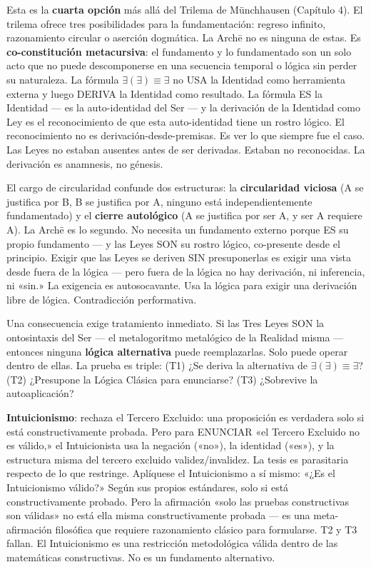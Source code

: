 \documentclass[10pt, openany, oneside]{book}
\begin{document}
Esta es la \textbf{cuarta opción} más allá del Trilema de M\"{u}nchhausen (Capítulo 4). El trilema ofrece tres posibilidades para la fundamentación: regreso infinito, razonamiento circular o aserción dogmática. La Arch\={e} no es ninguna de estas. Es \textbf{co-constitución metacursiva}: el fundamento y lo fundamentado son un solo acto que no puede descomponerse en una secuencia temporal o lógica sin perder su naturaleza. La fórmula $\exists(\exists) \equiv \exists$ no USA la Identidad como herramienta externa y luego DERIVA la Identidad como resultado. La fórmula ES la Identidad --- es la auto-identidad del Ser --- y la derivación de la Identidad como Ley es el reconocimiento de que esta auto-identidad tiene un rostro lógico. El reconocimiento no es derivación-desde-premisas. Es ver lo que siempre fue el caso. Las Leyes no estaban ausentes antes de ser derivadas. Estaban no reconocidas. La derivación es anamnesis, no génesis.

El cargo de circularidad confunde dos estructuras: la \textbf{circularidad viciosa} (A se justifica por B, B se justifica por A, ninguno está independientemente fundamentado) y el \textbf{cierre autológico} (A se justifica por ser A, y ser A requiere A). La Arch\={e} es lo segundo. No necesita un fundamento externo porque ES su propio fundamento --- y las Leyes SON su rostro lógico, co-presente desde el principio. Exigir que las Leyes se deriven SIN presuponerlas es exigir una vista desde fuera de la lógica --- pero fuera de la lógica no hay derivación, ni inferencia, ni «sin.» La exigencia es autosocavante. Usa la lógica para exigir una derivación libre de lógica. Contradicción performativa.

Una consecuencia exige tratamiento inmediato. Si las Tres Leyes SON la ontosintaxis del Ser --- el metalogoritmo metalógico de la Realidad misma --- entonces ninguna \textbf{lógica alternativa} puede reemplazarlas. Solo puede operar dentro de ellas. La prueba es triple: (T1) ¿Se deriva la alternativa de $\exists(\exists) \equiv \exists$? (T2) ¿Presupone la Lógica Clásica para enunciarse? (T3) ¿Sobrevive la autoaplicación?

\vspace{0.5em}

\textbf{Intuicionismo}: rechaza el Tercero Excluido: una proposición es verdadera solo si está constructivamente probada. Pero para ENUNCIAR «el Tercero Excluido no es válido,» el Intuicionista usa la negación («no»), la identidad («es»), y la estructura misma del tercero excluido validez/invalidez. La tesis es parasitaria respecto de lo que restringe. Aplíquese el Intuicionismo a sí mismo: «¿Es el Intuicionismo válido?» Según sus propios estándares, solo si está constructivamente probado. Pero la afirmación «solo las pruebas constructivas son válidas» no está ella misma constructivamente probada --- es una meta-afirmación filosófica que requiere razonamiento clásico para formularse. T2 y T3 fallan. El Intuicionismo es una restricción metodológica válida dentro de las matemáticas constructivas. No es un fundamento alternativo.
\end{document}
